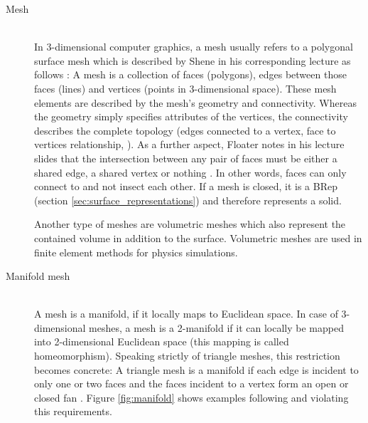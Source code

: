 \begin{description}
	
	\item[Mesh] \hfill \\
	In 3-dimensional computer graphics, a mesh usually refers to a polygonal surface mesh which is described by Shene in his corresponding lecture as follows \cite{mesh_basics}:
	A mesh is a collection of faces (\ie polygons), edges between those faces (\ie lines) and vertices (\ie points in 3-dimensional space).
	These mesh elements are described by the mesh's geometry and connectivity.
	Whereas the geometry simply specifies attributes of the vertices, the connectivity describes the complete topology (\eg edges connected to a vertex, face to vertices relationship, \etc).
	As a further aspect, Floater notes in his lecture slides that the intersection between any pair of faces must be either a shared edge, a shared vertex or nothing \cite{mesh_lecture10}.
	In other words, faces can only connect to and not insect each other.
	If a mesh is closed, it is a BRep (\cf section \ref{sec:surface_representations}) and therefore represents a solid.
	
	Another type of meshes are volumetric meshes which also represent the contained volume in addition to the surface.
	Volumetric meshes are used \eg in finite element methods for physics simulations.
	
	
	\item[Manifold mesh] \hfill \\
	A mesh is a manifold, if it locally maps to Euclidean space.
	In case of 3-dimensional meshes, a mesh is a 2-manifold if it can locally be mapped into 2-dimensional Euclidean space (this mapping is called homeomorphism).
	Speaking strictly of triangle meshes, this restriction becomes concrete:
	A triangle mesh is a manifold if each edge is incident to only one or two faces and the faces incident to a vertex form an open or closed fan \cite{mesh_basics}.
	Figure \ref{fig:manifold} shows examples following and violating this requirements.
	

\end{description}
